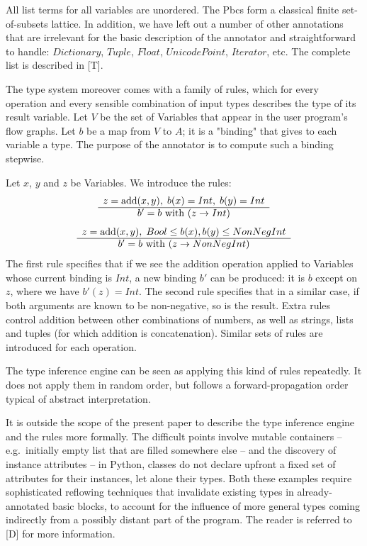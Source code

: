 \documentclass{acm_proc_article-sp}
\begin{document}
All list terms for all variables are unordered.  The Pbcs form a
classical finite set-of-subsets lattice.  In addition, we have left
out a number of other annotations that are irrelevant for the basic
description of the annotator and straightforward to handle:
$Dictionary$, $Tuple$, $Float$, $UnicodePoint$, $Iterator$, etc.  The
complete list is described in [T].

The type system moreover comes with a family of rules, which for every
operation and every sensible combination of input types describes the
type of its result variable.  Let $V$ be the set of Variables that
appear in the user program's flow graphs.  Let $b$ be a map from $V$
to $A$; it is a "binding" that gives to each variable a type.  The
purpose of the annotator is to compute such a binding stepwise.

Let $x$, $y$ and $z$ be Variables.  We introduce the rules:
%
$$
\begin{array}{c}
 z = \mathrm{add}(x, y), \; b(x) =
    Int, \; b(y) = Int \\ \hline
 b' = b \hbox{\ with\ } (z
    \rightarrow Int) 
\end{array}
$$
%
$$
\begin{array}{c}
 z = \mathrm{add}(x, y), \; Bool \leq b(x), b(y) \leq
    NonNegInt \\ \hline
 b' = b \hbox{\ with\ } (z
    \rightarrow NonNegInt) 
\end{array}
$$
%
The first rule specifies that if we see the addition operation applied to
Variables whose current binding is $Int$, a new binding $b'$ can be
produced: it is $b$ except on $z$, where we have $b'(z) = Int$.
The second rule specifies that in a similar case, if both arguments are
known to be non-negative, so is the result.  Extra rules control addition
between other combinations of numbers, as well as strings, lists and tuples
(for which addition is concatenation).  Similar sets of rules are
introduced for each operation.

The type inference engine can be seen as applying this kind of rules
repeatedly.  It does not apply them in random order, but follows a
forward-propagation order typical of abstract interpretation.

It is outside the scope of the present paper to describe the type
inference engine and the rules more formally.  The difficult points
involve mutable containers -- e.g.\ initially empty list that are filled
somewhere else -- and the discovery of instance attributes -- in Python,
classes do not declare upfront a fixed set of attributes for their
instances, let alone their types.  Both these examples require
sophisticated reflowing techniques that invalidate existing types in
already-annotated basic blocks, to account for the influence of more
general types coming indirectly from a possibly distant part of the
program.  The reader is referred to [D] for more information.
\end{document}
